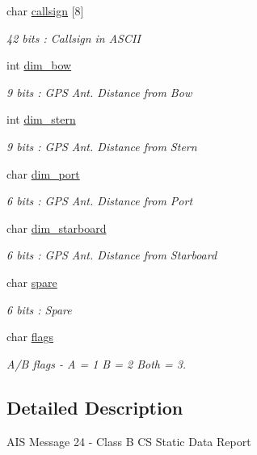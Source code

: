 \begin{DoxyCompactItemize}
char \mbox{\hyperlink{structaismsg__24_a4f228566aa426dcbae33dc20b5ceb966}{callsign}} \mbox{[}8\mbox{]}
\begin{DoxyCompactList}\small\item\em 42 bits \+: Callsign in A\+S\+C\+II \end{DoxyCompactList}\item 
int \mbox{\hyperlink{structaismsg__24_ac5d275e5489beeab8d031950269bc5fe}{dim\+\_\+bow}}
\begin{DoxyCompactList}\small\item\em 9 bits \+: G\+PS Ant. Distance from Bow \end{DoxyCompactList}\item 
int \mbox{\hyperlink{structaismsg__24_afa24ce0757b54600f9be4bab8bd4bb64}{dim\+\_\+stern}}
\begin{DoxyCompactList}\small\item\em 9 bits \+: G\+PS Ant. Distance from Stern \end{DoxyCompactList}\item 
char \mbox{\hyperlink{structaismsg__24_aa97c1413316032a1a67219a09b00b774}{dim\+\_\+port}}
\begin{DoxyCompactList}\small\item\em 6 bits \+: G\+PS Ant. Distance from Port \end{DoxyCompactList}\item 
char \mbox{\hyperlink{structaismsg__24_a4e020d67718ed77036c5761f93a69c45}{dim\+\_\+starboard}}
\begin{DoxyCompactList}\small\item\em 6 bits \+: G\+PS Ant. Distance from Starboard \end{DoxyCompactList}\item 
char \mbox{\hyperlink{structaismsg__24_a748f9c1c3f591156bb53dab0bc5c1959}{spare}}
\begin{DoxyCompactList}\small\item\em 6 bits \+: Spare \end{DoxyCompactList}\item 
char \mbox{\hyperlink{structaismsg__24_aefca52b145c57fbea09fcc696daafdbc}{flags}}
\begin{DoxyCompactList}\small\item\em A/B flags -\/ A = 1 B = 2 Both = 3. \end{DoxyCompactList}\end{DoxyCompactItemize}


\subsection{Detailed Description}
A\+IS Message 24 -\/ Class B CS Static Data Report

